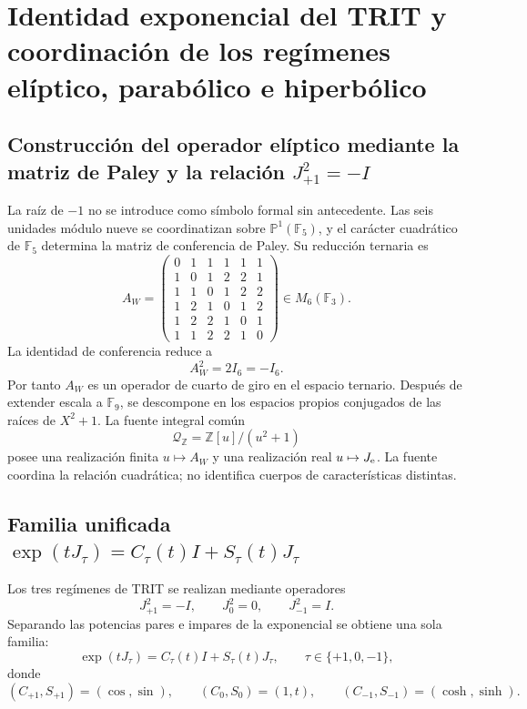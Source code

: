 \label{chap:83-11}

\section{Identidad exponencial del TRIT y coordinación de los regímenes elíptico, parabólico e hiperbólico}

\subsection{Construcción del operador elíptico mediante la matriz de Paley y la relación \texorpdfstring{\(J_{+1}^{2}=-I\)}{J² = -I}}

La raíz de \(-1\) no se introduce como símbolo formal sin antecedente. Las
seis unidades módulo nueve se coordinatizan sobre
\(\mathbb P^1(\mathbb F_5)\), y el carácter cuadrático de
\(\mathbb F_5\) determina la matriz de conferencia de Paley. Su reducción
ternaria es
\[
 A_W=
 \begin{pmatrix}
 0&1&1&1&1&1\\
 1&0&1&2&2&1\\
 1&1&0&1&2&2\\
 1&2&1&0&1&2\\
 1&2&2&1&0&1\\
 1&1&2&2&1&0
 \end{pmatrix}\in M_6(\mathbb F_3).
\]
La identidad de conferencia reduce a
\begin{equation}\label{p12-83-c11-s1:eq:constantes-raiz-interna-menos-uno}
 \boxed{A_W^2=2I_6=-I_6.}
\end{equation}
Por tanto \(A_W\) es un operador de cuarto de giro en el espacio ternario.
Después de extender escala a \(\mathbb F_9\), se descompone en los espacios
propios conjugados de las raíces de \(X^2+1\). La fuente integral común
\[
 \mathcal Q_{\mathbb Z}=\mathbb Z[u]/(u^2+1)
\]
posee una realización finita \(u\mapsto A_W\) y una realización real
\(u\mapsto J_{\rm e}\). La fuente coordina la relación cuadrática; no
identifica cuerpos de características distintas.

\subsection{Familia unificada \texorpdfstring{\(\exp(tJ_\tau)=C_\tau(t)I+S_\tau(t)J_\tau\)}{exp(t J tau) = C tau(t) I + S tau(t) J tau}}

Los tres regímenes de TRIT se realizan mediante operadores
\[
 J_{+1}^2=-I,\qquad J_0^2=0,\qquad J_{-1}^2=I.
\]
Separando las potencias pares e impares de la exponencial se obtiene una
sola familia:
\begin{equation}\label{p12-83-c11-s1:eq:constantes-euler-extendido}
 \boxed{
 \exp(tJ_\tau)=C_\tau(t)I+S_\tau(t)J_\tau,
 \qquad \tau\in\{+1,0,-1\},}
\end{equation}
donde
\[
 (C_{+1},S_{+1})=(\cos,\sin),\qquad
 (C_0,S_0)=(1,t),\qquad
 (C_{-1},S_{-1})=(\cosh,\sinh).
\]
